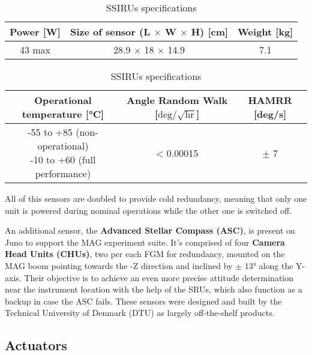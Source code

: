 \begin{itemize}
    \begin{table}[H]
        \renewcommand{\arraystretch}{1.3}
        \centering
        \begin{tabular}{|c|c|c|}
            \hline
            \textbf{Power [W]} & \textbf{Size of sensor (L $\boldsymbol{\times}$ W $\boldsymbol{\times}$ H) [cm]} & \textbf{Weight [kg]} \\
            \hline
            43 max & 28.9 $\times$ 18 $\times$ 14.9 & 7.1 \\   
            \hline
        \end{tabular}

        \vspace{5mm}

        \begin{tabular}{|c|c|c|}
            \hline
            \textbf{Operational temperature [°C]} & \textbf{Angle Random Walk [$\textrm{deg} / \sqrt{\textrm{hr}}$]} & \textbf{HAMRR [deg/s]} \\
            \hline
            \makecell{-55 to +85 (non-operational) \\  -10 to +60 (full performance)} & < 0.00015 & $\pm$ 7 \\
            \hline
        \end{tabular}
        \caption{SSIRUs specifications}
        \label{table:SSIRU}
    \end{table}
\end{itemize}

All of this sensors are doubled to provide cold redundancy, meaning that only one unit is powered during nominal operations while the other one is switched off.

An additional sensor, the \textbf{Advanced Stellar Compass (ASC)}, is present on Juno to support the MAG experiment suite. It's comprised of four \textbf{Camera Head Units (CHUs)}, two per each FGM for redundancy, mounted on the MAG boom pointing towards the -Z direction and inclined by $\pm$ 13° along the Y-axis. Their objective is to achieve an even more precise attitude determination near the instrument location with the help of the SRUs, which also function as a backup in case the ASC fails. These sensors were designed and built by the Technical University of Denmark (DTU) as largely off-the-shelf products. \cite{ASC_details}


\subsection{Actuators}
\label{subsec:Actuators}

